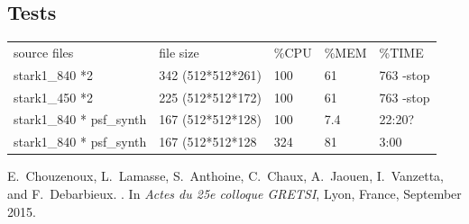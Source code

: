 \documentclass[12pt, a4paper]{scrartcl}
\begin{document}
\subsection{Tests}
\begin{tabular}{lllll}
   source files   &       file size    &  \%CPU & \%MEM & \%TIME \\
   stark1\_840 *2 &  342 (512*512*261) &  100   & 61    & 763 -stop \\
   stark1\_450 *2 & 225 (512*512*172)  &  100   & 61    & 763 -stop\\
   stark1\_840 * psf\_synth & 167 (512*512*128) &  100  & 7.4  & 22:20? \\
   stark1\_840 * psf\_synth & 167 (512*512*128  & 324 & 81  & 3:00 \\
\end{tabular}


\begin{thebibliography}{2}

E.~Chouzenoux, L.~Lamasse, S.~Anthoine, C.~Chaux, A.~Jaouen, I.~Vanzetta, and
  F.~Debarbieux.
.
\newblock In {\em {Actes du 25e colloque GRETSI}}, Lyon, France, September
  2015.
\end{thebibliography}
\end{document}
